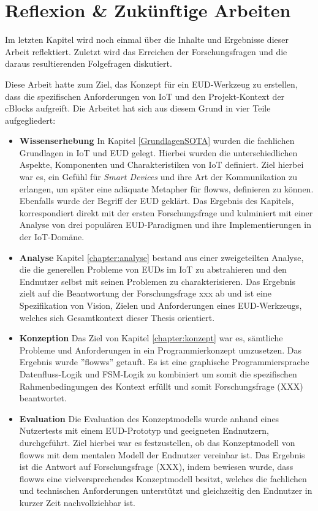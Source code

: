 \chapter{Reflexion \& Zukünftige Arbeiten}
Im letzten Kapitel wird noch einmal über die Inhalte und Ergebnisse dieser Arbeit reflektiert. Zuletzt wird das Erreichen der Forschungsfragen und die daraus resultierenden Folgefragen diskutiert.

Diese Arbeit hatte zum Ziel, das Konzept für ein \ac{EUD}-Werkzeug zu erstellen, dass die spezifischen Anforderungen von \ac{IoT} und den Projekt-Kontext der \acp{cBlock} aufgreift. Die Arbeitet hat sich aus diesem Grund in vier Teile aufgegliedert:

\begin{itemize}
    \item \textbf{Wissenserhebung} In Kapitel \ref{GrundlagenSOTA} wurden die fachlichen Grundlagen in \ac{IoT} und \ac{EUD} gelegt. Hierbei wurden die unterschiedlichen Aspekte, Komponenten und Charakteristiken von \ac{IoT} definiert. Ziel hierbei war es, ein Gefühl für \textit{Smart Devices} und ihre Art der Kommunikation zu erlangen, um später eine adäquate Metapher für flowws, definieren zu können. Ebenfalls wurde der Begriff der \ac{EUD} geklärt. Das Ergebnis des Kapitels, korrespondiert direkt mit der ersten Forschungsfrage und kulminiert mit einer Analyse von drei populären \ac{EUD}-Paradigmen und ihre Implementierungen in der \ac{IoT}-Domäne.
    \item \textbf{Analyse} Kapitel \ref{chapter:analyse} bestand aus einer zweigeteilten Analyse, die die generellen Probleme von \acp{EUD} im \ac{IoT} zu abstrahieren und den Endnutzer selbst mit seinen Problemen zu charakterisieren. Das Ergebnis zielt auf die Beantwortung der Forschungsfrage xxx ab und ist eine Spezifikation von Vision, Zielen und Anforderungen eines \ac{EUD}-Werkzeugs, welches sich Gesamtkontext dieser Thesis orientiert.
    \item \textbf{Konzeption} Das Ziel von Kapitel \ref{chapter:konzept} war es, sämtliche Probleme und Anforderungen in ein Programmierkonzept umzusetzen. Das Ergebnis wurde ''flowws'' getauft. Es ist eine graphische Programmiersprache Datenfluss-Logik und \ac{FSM}-Logik zu kombiniert um somit die spezifischen Rahmenbedingungen des Kontext erfüllt und somit Forschungsfrage (XXX) beantwortet.
    \item \textbf{Evaluation} Die Evaluation des Konzeptmodells wurde anhand eines Nutzertests mit einem \ac{EUD}-Prototyp und geeigneten Endnutzern, durchgeführt. Ziel hierbei war es festzustellen, ob das Konzeptmodell von flowws mit dem mentalen Modell der Endnutzer vereinbar ist. Das Ergebnis ist die Antwort auf Forschungsfrage (XXX), indem bewiesen wurde, dass flowws eine vielversprechendes Konzeptmodell besitzt, welches die fachlichen und technischen Anforderungen unterstützt und gleichzeitig den Endnutzer in kurzer Zeit nachvollziehbar ist.
\end{itemize}

